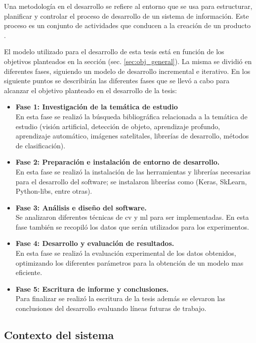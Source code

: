 Una metodología en el desarrollo se refiere al entorno que se usa para estructurar, planificar y controlar el proceso de desarrollo de un sistema de información. Este proceso es un conjunto de actividades que conducen a la creación de un producto \citep{sommerville}.


El modelo utilizado para el desarrollo de esta tesis está en función de los objetivos planteados en la sección (sec. \ref{sec:obj_general}). La misma se dividió en diferentes fases, siguiendo un modelo de desarrollo incremental e iterativo. En los siguiente puntos se describirán las diferentes fases que se llevó a cabo para alcanzar el objetivo planteado en el desarrollo de la tesis:
\begin{itemize}
	\item \textbf{Fase 1: Investigación de la temática de estudio}\\
	En esta fase se realizó la búsqueda bibliográfica relacionada a la temática de estudio (visión artificial, detección de objeto, 
	aprendizaje profundo, aprendizaje automático, imágenes satelitales, librerías de desarrollo, métodos de clasificación).
	\item \textbf{Fase 2: Preparación e instalación de entorno de desarrollo.}\\
	En esta fase se realizó la instalación de las herramientas y librerías necesarias para el desarrollo del software; se instalaron librerías  
como (Keras, SkLearn, Python-libs, entre otras).
	\item \textbf{Fase 3: Análisis e diseño del software.}\\
	Se analizaron diferentes técnicas de \ac{cv} y \ac{ml} para ser implementadas. En esta fase también se recopiló los datos que serán utilizados para los experimentos.
	\item \textbf{Fase 4: Desarrollo y evaluación de resultados.}\\
	En esta fase se realizó la evaluación experimental de los datos obtenidos, optimizando los diferentes parámetros para la obtención de un 
modelo mas eficiente.
	\item \textbf{Fase 5: Escritura de informe y conclusiones.}\\
	Para finalizar se realizó la escritura de la tesis además se elevaron las conclusiones del desarrollo evaluando líneas futuras de trabajo.
\end{itemize}


\subsection{Contexto del sistema}\label{sub:casodeuso}

